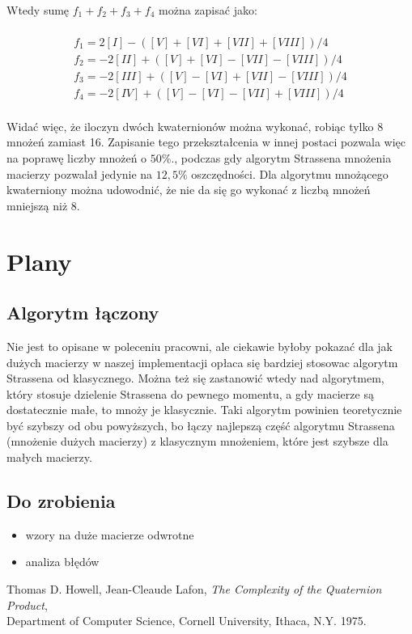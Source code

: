 \documentclass[paper=a4, fontsize=11pt]{scrartcl} %
\numberwithin{equation}{section} %
\numberwithin{figure}{section} %
\numberwithin{table}{section} %
\begin{document}
Wtedy sumę ${f_1+f_2+f_3+f_4}$ można zapisać jako:

\begin{equation}
\begin{gathered}
\\
f_1 = 2[I] - ([V] + [VI] + [VII] + [VIII])/4 \\ 
f_2 = -2[II] + ([V] + [VI] - [VII] - [VIII])/4 \\ 
f_3 = -2[III] + ([V] - [VI] + [VII] - [VIII])/4 \\
f_4 = -2[IV] + ([V] - [VI] - [VII] + [VIII])/4 \\
\end{gathered}
\end{equation}

Widać więc, że iloczyn dwóch kwaternionów można wykonać, robiąc tylko 8 mnożeń zamiast 16\cite{quaternion}. 
Zapisanie tego przekształcenia w innej postaci pozwala więc na poprawę liczby mnożeń o ${50\%}$., 
podczas gdy algorytm Strassena mnożenia macierzy pozwalał jedynie na ${12,5\%}$ oszczędności.\medbreak
Dla algorytmu mnożącego kwaterniony można udowodnić, że nie da się go wykonać z liczbą mnożeń mniejszą niż 8.\cite{quaternion}

\section{Plany}

\subsection{Algorytm łączony}

Nie jest to opisane w poleceniu pracowni, ale ciekawie byłoby pokazać dla jak dużych macierzy w naszej implementacji opłaca się bardziej stosowac algorytm Strassena od klasycznego. Można też się zastanowić wtedy nad algorytmem, który stosuje dzielenie Strassena do pewnego momentu, a gdy macierze są dostatecznie małe, to mnoży je klasycznie.
Taki algorytm powinien teoretycznie być szybszy od obu powyższych, bo łączy najlepszą część algorytmu Strassena (mnożenie dużych macierzy) z klasycznym mnożeniem, 
które jest szybsze dla małych macierzy.

\subsection{Do zrobienia}

\begin{itemize}
  \item wzory na duże macierze odwrotne
  \item analiza błędów
\end{itemize}

\begin{thebibliography}{9}

  Thomas D. Howell,
  Jean-Cleaude Lafon,
  \textit{The Complexity of the Quaternion Product}, \\
  Department of Computer Science, Cornell University, Ithaca, N.Y.
  1975.

\end{thebibliography}
\end{document}
